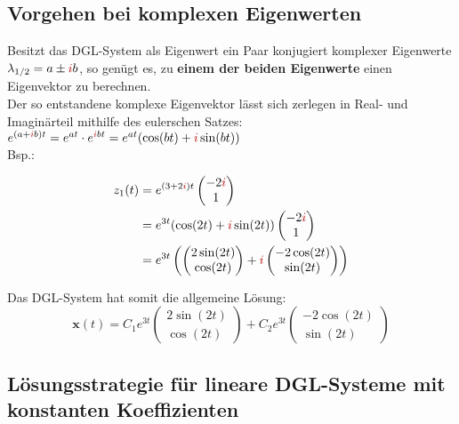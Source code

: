 \documentclass[12pt, a4paper]{scrreprt}
\begin{document}
\subsection{Vorgehen bei komplexen Eigenwerten}

Besitzt das DGL-System als Eigenwert ein Paar konjugiert komplexer Eigenwerte \(\lambda_{1/2} = a \pm \mytextred{i}b\), so genügt es, zu \textbf{einem der beiden Eigenwerte} einen Eigenvektor zu berechnen.\\
Der so entstandene komplexe Eigenvektor lässt sich zerlegen in Real- und Imaginärteil mithilfe des eulerschen Satzes: \(e^{(a+\mytextred{i}b)t} = e^{at} \cdot e^{\mytextred{i} bt} = e^{at} (\cos (bt) + \mytextred{i} \sin (bt))\)\\
Bsp.:

\begin{align*}
  z_1(t) &= e^{(3 + 2 \mytextred{i}) t}
  \begin{pmatrix}
    -2 \mytextred{i}\\
    1
  \end{pmatrix}\\
  &= e^{3t} (\cos (2t) + \mytextred{i} \sin (2t))
  \begin{pmatrix}
    -2 \mytextred{i}\\
    1
  \end{pmatrix}\\
         &= e^{3t} \left(
           \begin{pmatrix}
             2 \sin (2t)\\
             \cos (2t)
           \end{pmatrix}
  +\mytextred{i}
  \begin{pmatrix}
    -2 \cos (2t)\\
    \sin (2t)
  \end{pmatrix}
           \right)
\end{align*}

Das DGL-System hat somit die allgemeine Lösung:
\[
  \mathbf{x}(t) = C_1 e^{3t}
  \begin{pmatrix}
    2 \sin (2t)\\
    \cos (2t)
  \end{pmatrix}
  + C_2 e^{3t}
  \begin{pmatrix}
    -2 \cos (2t)\\
    \sin (2t)
  \end{pmatrix}
\]

\subsection{Lösungsstrategie für lineare DGL-Systeme mit konstanten Koeffizienten}
\end{document}
